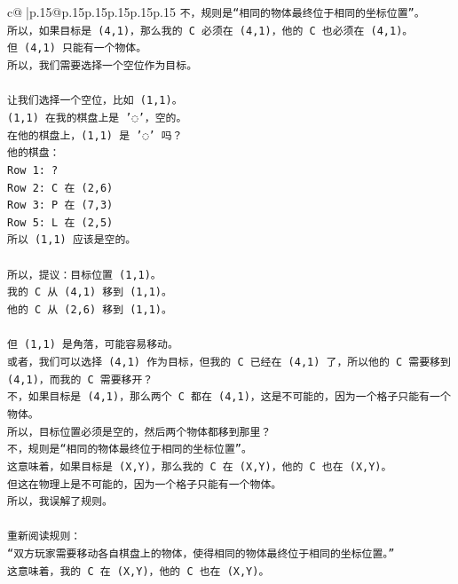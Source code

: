 \documentclass{article}
\begin{document}
{\begin{supertabular}{c@{$\;$}|p{.15\linewidth}@{}p{.15\linewidth}p{.15\linewidth}p{.15\linewidth}p{.15\linewidth}p{.15\linewidth}}
{{{\texttt{不，规则是“相同的物体最终位于相同的坐标位置”。} \\
\texttt{所以，如果目标是 (4,1)，那么我的 C 必须在 (4,1)，他的 C 也必须在 (4,1)。} \\
\texttt{但 (4,1) 只能有一个物体。} \\
\texttt{所以，我们需要选择一个空位作为目标。} \\
\\ 
\texttt{让我们选择一个空位，比如 (1,1)。} \\
\texttt{(1,1) 在我的棋盘上是 '◌'，空的。} \\
\texttt{在他的棋盘上，(1,1) 是 '◌' 吗？} \\
\texttt{他的棋盘：} \\
\texttt{Row 1: ?} \\
\texttt{Row 2: C 在 (2,6)} \\
\texttt{Row 3: P 在 (7,3)} \\
\texttt{Row 5: L 在 (2,5)} \\
\texttt{所以 (1,1) 应该是空的。} \\
\\ 
\texttt{所以，提议：目标位置 (1,1)。} \\
\texttt{我的 C 从 (4,1) 移到 (1,1)。} \\
\texttt{他的 C 从 (2,6) 移到 (1,1)。} \\
\\ 
\texttt{但 (1,1) 是角落，可能容易移动。} \\
\texttt{或者，我们可以选择 (4,1) 作为目标，但我的 C 已经在 (4,1) 了，所以他的 C 需要移到 (4,1)，而我的 C 需要移开？} \\
\texttt{不，如果目标是 (4,1)，那么两个 C 都在 (4,1)，这是不可能的，因为一个格子只能有一个物体。} \\
\texttt{所以，目标位置必须是空的，然后两个物体都移到那里？} \\
\texttt{不，规则是“相同的物体最终位于相同的坐标位置”。} \\
\texttt{这意味着，如果目标是 (X,Y)，那么我的 C 在 (X,Y)，他的 C 也在 (X,Y)。} \\
\texttt{但这在物理上是不可能的，因为一个格子只能有一个物体。} \\
\texttt{所以，我误解了规则。} \\
\\ 
\texttt{重新阅读规则：} \\
\texttt{“双方玩家需要移动各自棋盘上的物体，使得相同的物体最终位于相同的坐标位置。”} \\
\texttt{这意味着，我的 C 在 (X,Y)，他的 C 也在 (X,Y)。} \\
}}}
\end{supertabular}}
\end{document}
